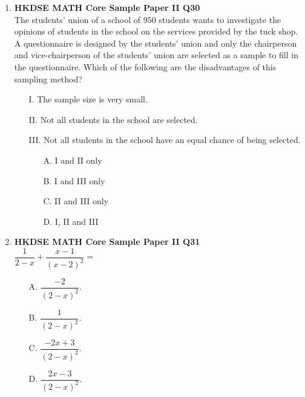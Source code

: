 \documentclass[12pt]{article}
\begin{document}
\begin{enumerate}
	\item \textbf{HKDSE MATH Core Sample Paper II Q30}\\
	The students' union of a school of 950 students wants to investigate the opinions of students in the school on the services provided by the tuck shop. A questionnaire is designed by the students' union and only the chairperson and vice-chairperson of the students' union are selected as a sample to fill in the questionnaire. Which of the following are the disadvantages of this sampling method?
	\begin{enumerate}
		\item[I.] The sample size is very small.
		\item[II.] Not all students in the school are selected.
		\item[III.] Not all students in the school have an equal chance of being selected.
		\item[]
		\begin{enumerate}
			\item[A.] I and II only
			\item[B.] I and III only
			\item[C.] II and III only
			\item[D.] I, II and III
		\end{enumerate}
	\end{enumerate}
	
	\item \textbf{HKDSE MATH Core Sample Paper II Q31}\\
	$\dfrac{1}{2 - x} + \dfrac{x - 1}{(x - 2)^2} = $
	\begin{enumerate}
		\item[A.] $\dfrac{-2}{(2 - x)^2}$.
		\item[B.] $\dfrac{1}{(2 - x)^2}$.
		\item[C.] $\dfrac{-2x + 3}{(2 - x)^2}$.
		\item[D.] $\dfrac{2x - 3}{(2 - x)^2}$.
	\end{enumerate}
	

\end{enumerate}
\end{document}
